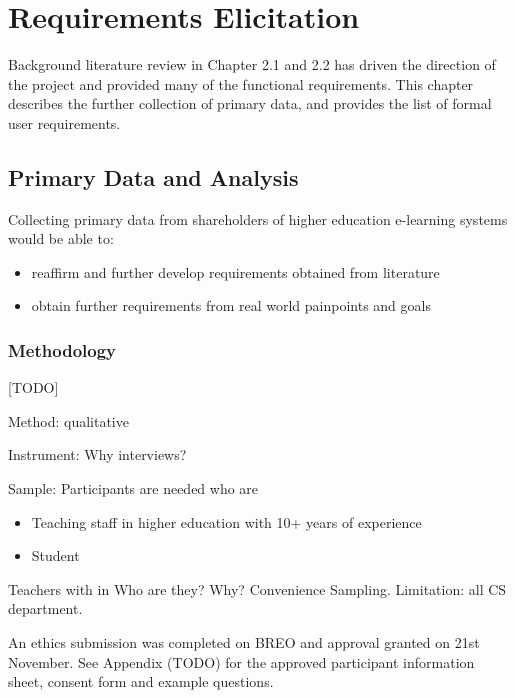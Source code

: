 \chapter{Requirements Elicitation}
\graphicspath{{Chapter4/Figs/Raster/}{Chapter4/Figs/}}

Background literature review in Chapter 2.1 and 2.2 has driven the direction of the project and
provided many of the functional requirements. This chapter describes the further collection of primary
data, and provides the list of formal user requirements.

\section{Primary Data and Analysis}
Collecting primary data from shareholders of higher education e-learning systems would be able to:
\begin{itemize}
	\item reaffirm and further develop requirements obtained from literature
	\item obtain further requirements from real world painpoints and goals
\end{itemize}

\subsection{Methodology}

[TODO]

Method: qualitative

Instrument: Why interviews?

Sample: Participants are needed who are
\begin{itemize}
	\item Teaching staff in higher education with 10+ years of experience
	\item Student
\end{itemize}Teachers with  in Who are they? Why? Convenience Sampling. Limitation: all CS department.

An ethics submission was completed on BREO and approval granted on 21st November.
See Appendix (TODO) for the approved participant information sheet, consent form and example questions.

